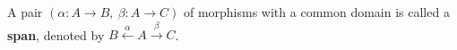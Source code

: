 \begin{definition}
    A pair \( (\alpha : A \mathop{\to} B,~\beta : A \mathop{\to} C) \) of morphisms with a common domain is called a \textbf{span}, denoted by \( B \overset{\alpha}{\leftarrow} A \overset{\beta}{\rightarrow} C \).
\end{definition}
